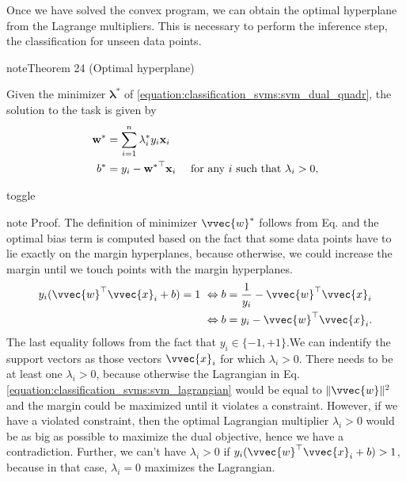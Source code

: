 \documentclass[letterpaper,10pt,english]{jupyterBook}
\begin{document}
\sphinxAtStartPar
Once we have solved the convex program, we can obtain the optimal hyperplane from the Lagrange multipliers. This is necessary to perform the inference step, the classification for unseen data points.
\label{classification_svms:theorem-5}
\begin{sphinxadmonition}{note}{Theorem 24 (Optimal hyperplane)}



\sphinxAtStartPar
Given the minimizer \( \boldsymbol{\lambda}^{\ast} \) of \eqref{equation:classification_svms:svm_dual_quadr}, the solution to the {\hyperref[\detokenize{classification_svms:hard-margin-svm-task}]{}} task is given by
\begin{equation}\label{equation:classification_svms:primal_optimal}
\begin{split}\begin{align*}
{\bf w}^{\ast} &= \sum_{i=1}^{n} \lambda_{i}^{\ast} y_{i} {\bf x}_{i}\\
b^{\ast} &= y_{i} - {{\bf w}^{\ast}}^\top {\bf x}_{i}  \quad\text{ for any }i\text{ such that } \lambda_{i} > 0 ,
\end{align*}\end{split}
\end{equation}\end{sphinxadmonition}

\begin{sphinxuseclass}{toggle}
\begin{sphinxadmonition}{note}
\sphinxAtStartPar
Proof. The definition of minimizer \(\vvec{w}^*\) follows from Eq. and the optimal bias term is computed based on the fact that some data points have to lie exactly on the margin hyperplanes, because otherwise, we could increase the margin until we touch points with the margin hyperplanes.
\begin{align*}
y_i(\vvec{w}^\top\vvec{x}_i+b)=1\ & \Leftrightarrow b=\frac{1}{y_i}-\vvec{w}^\top\vvec{x}_i\\
&\Leftrightarrow b=y_i-\vvec{w}^\top\vvec{x}_i.
\end{align*}
\sphinxAtStartPar
The last equality follows from the fact that \(y_i\in\{-1,+1\}\).We can indentify the support vectors as those vectors \(\vvec{x}_i\) for which \(\lambda_i>0\). There needs to be at least one \(\lambda_i>0\), because otherwise the Lagrangian in Eq.\eqref{equation:classification_svms:svm_lagrangian} would be equal to \(\lVert\vvec{w}\rVert^2\) and the margin could be maximized until it violates a constraint. However, if we have a violated constraint, then the optimal Lagrangian multiplier \(\lambda_i>0\) would be as big as possible to maximize the dual objective, hence we have a contradiction. Further, we can’t have \(\lambda_i>0\) if \(y_i(\vvec{w}^\top\vvec{x}_i+b)>1\), because in that case, \(\lambda_i=0\) maximizes the Lagrangian.
\end{sphinxadmonition}

\end{sphinxuseclass}
\end{document}
